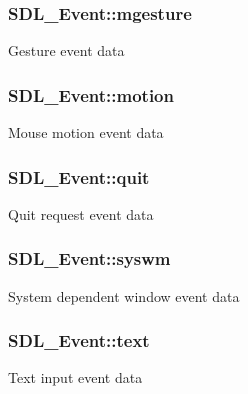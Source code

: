 \subsubsection[{mgesture}]{ S\+D\+L\+\_\+\+Event\+::mgesture}\label{union_s_d_l___event_ac19b3c6a6b5181a51eb4fbe2cbe726a9}
Gesture event data \hypertarget{union_s_d_l___event_ac3c89e190faacbe84280cd539453bab6}{}
\subsubsection[{motion}]{ S\+D\+L\+\_\+\+Event\+::motion}\label{union_s_d_l___event_ac3c89e190faacbe84280cd539453bab6}
Mouse motion event data \hypertarget{union_s_d_l___event_a102a3008afe67a1c02ae7504e232dcef}{}
\subsubsection[{quit}]{ S\+D\+L\+\_\+\+Event\+::quit}\label{union_s_d_l___event_a102a3008afe67a1c02ae7504e232dcef}
Quit request event data \hypertarget{union_s_d_l___event_ab3b2eaf5348d4c50a51b1f297fdef537}{}
\subsubsection[{syswm}]{ S\+D\+L\+\_\+\+Event\+::syswm}\label{union_s_d_l___event_ab3b2eaf5348d4c50a51b1f297fdef537}
System dependent window event data \hypertarget{union_s_d_l___event_aa4fc65c559d69f33c057c0c23d8414b8}{}
\subsubsection[{text}]{ S\+D\+L\+\_\+\+Event\+::text}\label{union_s_d_l___event_aa4fc65c559d69f33c057c0c23d8414b8}
Text input event data \hypertarget{union_s_d_l___event_ab18d7d60794cb056948ffa58541bc3c5}{}
